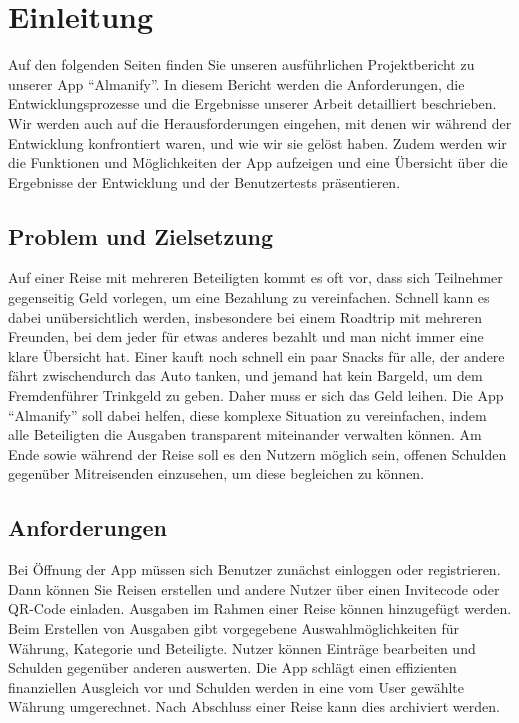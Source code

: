 \section{Einleitung}

Auf den folgenden Seiten finden Sie unseren ausführlichen Projektbericht zu unserer App \enquote{Almanify}.
In diesem Bericht werden die Anforderungen, die Entwicklungsprozesse und die Ergebnisse unserer Arbeit detailliert beschrieben.
Wir werden auch auf die Herausforderungen eingehen, mit denen wir während der Entwicklung konfrontiert waren, und wie wir sie gelöst haben.
Zudem werden wir die Funktionen und Möglichkeiten der App aufzeigen und eine Übersicht über die Ergebnisse der Entwicklung und der Benutzertests präsentieren.

\subsection{Problem und Zielsetzung}

Auf einer Reise mit mehreren Beteiligten kommt es oft vor, dass sich Teilnehmer gegenseitig Geld vorlegen, um eine Bezahlung zu vereinfachen.
Schnell kann es dabei unübersichtlich werden, insbesondere bei einem Roadtrip mit mehreren Freunden,
bei dem jeder für etwas anderes bezahlt und man nicht immer eine klare Übersicht hat.
Einer kauft noch schnell ein paar Snacks für alle, der andere fährt zwischendurch das Auto tanken,
und jemand hat kein Bargeld, um dem Fremdenführer Trinkgeld zu geben.
Daher muss er sich das Geld leihen.
Die App \enquote{Almanify} soll dabei helfen, diese komplexe Situation zu vereinfachen, indem alle Beteiligten die Ausgaben transparent miteinander verwalten können.
Am Ende sowie während der Reise soll es den Nutzern möglich sein, offenen Schulden gegenüber Mitreisenden einzusehen, um diese begleichen zu können.

\subsection{Anforderungen}

Bei Öffnung der App müssen sich Benutzer zunächst einloggen oder registrieren.
Dann können Sie Reisen erstellen und andere Nutzer über einen Invitecode oder QR-Code einladen.
Ausgaben im Rahmen einer Reise können hinzugefügt werden.
Beim Erstellen von Ausgaben gibt vorgegebene Auswahlmöglichkeiten für Währung, Kategorie und Beteiligte.
Nutzer können Einträge bearbeiten und Schulden gegenüber anderen auswerten.
Die App schlägt einen effizienten finanziellen Ausgleich vor und Schulden werden in eine vom User gewählte Währung umgerechnet.
Nach Abschluss einer Reise kann dies archiviert werden.


